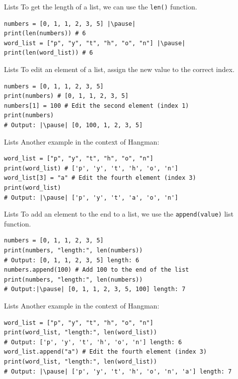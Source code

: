 \documentclass[dvipsnames, svgnames, x11names, handout]{beamer}
\begin{document}
\begin{frame}[fragile]{Lists}
To get the length of a list, we can use the \texttt{len()} function. \pause
\begin{verbatim}
numbers = [0, 1, 1, 2, 3, 5] |\pause|
print(len(numbers)) # 6 
word_list = ["p", "y", "t", "h", "o", "n"] |\pause|
print(len(word_list)) # 6
\end{verbatim}
\end{frame}

\begin{frame}[fragile]{Lists}
To edit an element of a list, assign the new value to the correct index. \pause
\begin{verbatim}
numbers = [0, 1, 1, 2, 3, 5]
print(numbers) # [0, 1, 1, 2, 3, 5]
numbers[1] = 100 # Edit the second element (index 1)
print(numbers)  
# Output: |\pause| [0, 100, 1, 2, 3, 5]
\end{verbatim}
\end{frame}

\begin{frame}[fragile]{Lists}
Another example in the context of Hangman:
\begin{verbatim}
word_list = ["p", "y", "t", "h", "o", "n"]
print(word_list) # ['p', 'y', 't', 'h', 'o', 'n']
word_list[3] = "a" # Edit the fourth element (index 3)
print(word_list)  
# Output: |\pause| ['p', 'y', 't', 'a', 'o', 'n']
\end{verbatim}
\end{frame}

\begin{frame}[fragile]{Lists}
To add an element to the end to a list, we use the \texttt{append(value)} list function. \pause
\begin{verbatim}
numbers = [0, 1, 1, 2, 3, 5]
print(numbers, "length:", len(numbers)) 
# Output: [0, 1, 1, 2, 3, 5] length: 6
numbers.append(100) # Add 100 to the end of the list
print(numbers, "length:", len(numbers))
# Output:|\pause| [0, 1, 1, 2, 3, 5, 100] length: 7
\end{verbatim}
\end{frame}

\begin{frame}[fragile]{Lists}
Another example in the context of Hangman:
\begin{verbatim}
word_list = ["p", "y", "t", "h", "o", "n"]
print(word_list, "length:", len(word_list)) 
# Output: ['p', 'y', 't', 'h', 'o', 'n'] length: 6
word_list.append("a") # Edit the fourth element (index 3)
print(word_list, "length:", len(word_list))  
# Output: |\pause| ['p', 'y', 't', 'h', 'o', 'n', 'a'] length: 7
\end{verbatim}
\end{frame}
\end{document}
